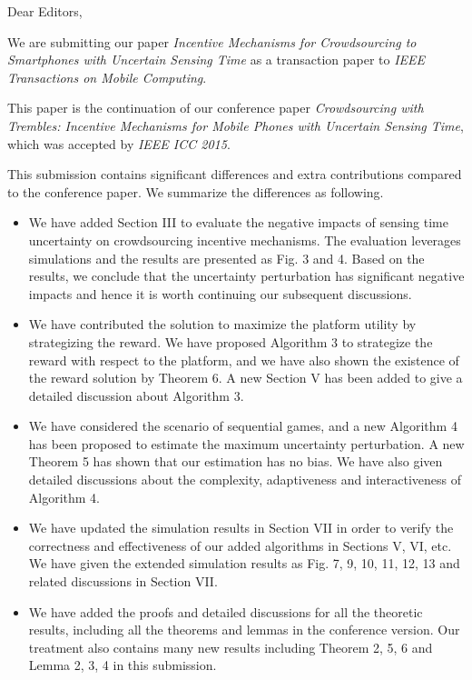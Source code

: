 \documentclass{article}
\begin{document}
\setlength{\parindent}{0cm}
\setlength{\parskip}{\baselineskip}

Dear Editors,

We are submitting our paper \emph{Incentive Mechanisms for Crowdsourcing to Smartphones with Uncertain Sensing Time} as a transaction paper to \emph{IEEE Transactions on Mobile Computing}.

This paper is the continuation of our conference paper \emph{Crowdsourcing with Trembles: Incentive Mechanisms for Mobile Phones with Uncertain Sensing Time}, which was accepted by \emph{IEEE ICC 2015}.

This submission contains significant differences and extra contributions compared to the conference paper. We summarize the differences as following.
\begin{itemize}
\item We have added Section III to evaluate the negative impacts of sensing time uncertainty on crowdsourcing incentive mechanisms. The evaluation leverages simulations and the results are presented as Fig. 3 and 4. Based on the results, we conclude that the uncertainty perturbation has significant negative impacts and hence it is worth continuing our subsequent discussions.
\item We have contributed the solution to maximize the platform utility by strategizing the reward. We have proposed Algorithm 3 to strategize the reward with respect to the platform, and we have also shown the existence of the reward solution by Theorem 6. A new Section V has been added to give a detailed discussion about Algorithm 3.
\item We have considered the scenario of sequential games, and a new Algorithm 4 has been proposed to estimate the maximum uncertainty perturbation. A new Theorem 5 has shown that our estimation has no bias. We have also given detailed discussions about the complexity, adaptiveness and interactiveness of Algorithm 4.
\item We have updated the simulation results in Section VII in order to verify the correctness and effectiveness of our added algorithms in Sections V, VI, etc. We have given the extended simulation results as Fig. 7, 9, 10, 11, 12, 13 and related discussions in Section VII.
\item We have added the proofs and detailed discussions for all the theoretic results, including all the theorems and lemmas in the conference version. Our treatment also contains many new results including Theorem 2, 5, 6 and Lemma 2, 3, 4 in this submission.

\end{itemize}
\end{document}
